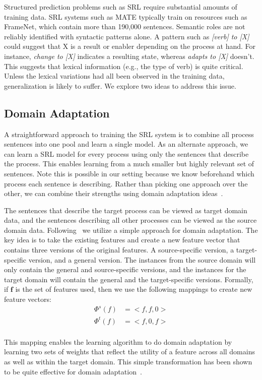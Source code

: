 Structured prediction problems such as SRL require substantial amounts of training data. 
SRL systems such as MATE typically train on resources such as FrameNet, which contain more than 190,000 sentences. 
Semantic roles are not reliably identified with syntactic patterns alone. 
A pattern such as {\em [verb] to [X]} could suggest that X is a result or enabler depending on the process at hand. 
For instance, {\em change to [X]} indicates a resulting state, whereas {\em adapts to [X]} doesn't. 
This suggests that lexical information (e.g., the type of verb) is quite critical. 
Unless the lexical variations had all been observed in the training data, generalization is likely to suffer. 
We explore two ideas to address this issue.

\subsection{Domain Adaptation}

A straightforward approach to training the SRL system is to combine all process sentences into one pool and learn a single model. 
As an alternate approach, we can learn a SRL model for every process using only the sentences that describe the process. 
This enables learning from a much smaller but highly relevant set of sentences. 
Note this is possible in our setting because we know beforehand which process each sentence is describing.
Rather than picking one approach over the other, we can combine their strengths using domain adaptation ideas~\cite{}.

The sentences that describe the target process can be viewed as target domain data, and the sentences describing all other processes can be viewed as the source domain data. Following~\cite{daume} we utilize a simple approach for domain adaptation. The key idea is to take the existing features and create a new feature vector that contains three versions of the original features. A source-specific version, a target-specific version, and a general version. The instances from the source domain will only contain the general and source-specific versions, and the instances for the target domain will contain the general and the target-specific versions. Formally, if $\mathbf{f}$ is the set of features used, then we use the following mappings to create new feature vectors:\\
\begin{align*}
\Phi^{s}(f) &= <f, f, 0>\\
\Phi^{t}(f) &= <f, 0, f>\\
\end{align*}

This mapping enables the learning algorithm to do domain adaptation by learning two sets of weights that reflect the utility of a feature across all domains as well as within the target domain. This simple transformation has been shown to be quite effective for domain adaptation~\cite{}.




